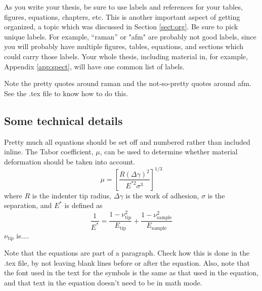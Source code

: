 As you write your thesis, be sure to use labels and references for your tables, figures, equations, chapters, etc.  This is another important aspect of getting organized, a topic which was discussed in Section \ref{sect:org}.  Be sure to pick unique labels.  For example, ``raman'' or "afm" are probably not good labels, since you will probably have multiple figures, tables, equations, and sections which could carry those labels. Your whole thesis, including material in, for example, Appendix \ref{app:spect}, will have one common list of labels.

Note the pretty quotes around raman and the not-so-pretty quotes around afm.  See the .tex file to know how to do this.

\subsection{Some technical details}

Pretty much all equations should be set off and numbered rather than included inline.  The Tabor coefficient, $\mu$, can be used to determine whether material deformation should be taken into account.\cite{tabor}
%
\begin{equation}
\label{eqn:tabor}
\mu = \left[ \frac{R(\Delta\gamma)^2}{E^{*2} \sigma^3} \right]^{1/3}
\end{equation}
%
where $R$ is the indenter tip radius, $\Delta\gamma$ is the work of adhesion, $\sigma$ is the separation, and $E^*$ is defined as
%
\begin{equation}
\label{eqn:Estar}
\frac{1}{E^*} = \frac{1-\nu_\text{tip}^2}{E_\text{tip}} + \frac{1-\nu_\text{sample}^2}{E_\text{sample}}
\end{equation}
%
$\nu_\text{tip}$ is....

Note that the equations are part of a paragraph.  Check how this is done in the .tex file, by not leaving blank lines before or after the equation.  Also, note that the font used in the text for the symbols is the same as that used in the equation, and that text in the equation doesn't need to be in math mode.